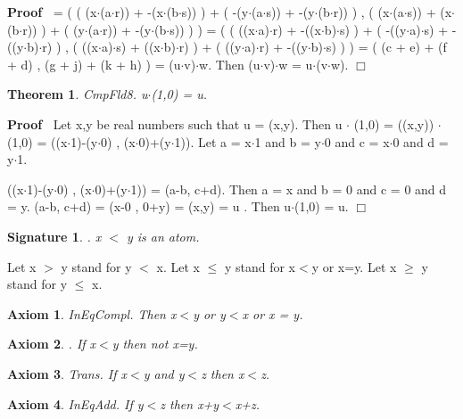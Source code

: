 \documentclass{article}
\newenvironment{forthel}{\begin{leftbar}}{\end{leftbar}}
\newenvironment{proof}{\noindent\textbf{Proof\ }}{\hspace*{\fill}$\Box$\medskip}
\newtheorem{axiom}{Axiom}
\newtheorem{theorem}{Theorem}
\newtheorem{signature}{Signature}
\newcommand{\cmul}{\cdot}
\begin{document}
\begin{forthel}
\begin{proof}
= (  ( (x$\cdot$(a$\cdot$r)) + -(x$\cdot$(b$\cdot$s)) ) + ( -(y$\cdot$(a$\cdot$s)) + -(y$\cdot$(b$\cdot$r)) )  ,  ( (x$\cdot$(a$\cdot$s)) + (x$\cdot$(b$\cdot$r)) ) + ( (y$\cdot$(a$\cdot$r)) + -(y$\cdot$(b$\cdot$s)) ) )
= (  ( ((x$\cdot$a)$\cdot$r) + -((x$\cdot$b)$\cdot$s) ) + ( -((y$\cdot$a)$\cdot$s) + -((y$\cdot$b)$\cdot$r) )  ,  ( ((x$\cdot$a)$\cdot$s) + ((x$\cdot$b)$\cdot$r) ) + ( ((y$\cdot$a)$\cdot$r) + -((y$\cdot$b)$\cdot$s) ) )
= ( (c + e) + (f + d) , (g + j) + (k + h) ) = (u$\cmul$v)$\cmul$w.
Then (u$\cmul$v)$\cmul$w = u$\cmul$(v$\cmul$w). \end{proof}



\begin{theorem}
 CmpFld8. u$\cmul$(1,0) = u.
\end{theorem}\begin{proof}
 Let x,y be real numbers such that u = (x,y). Then u $\cmul$ (1,0) = ((x,y)) $\cmul$ (1,0) = ((x$\cdot$1)-(y$\cdot$0) , (x$\cdot$0)+(y$\cdot$1)). 
Let a = x$\cdot$1 and b = y$\cdot$0 and c = x$\cdot$0 and d = y$\cdot$1.

((x$\cdot$1)-(y$\cdot$0) , (x$\cdot$0)+(y$\cdot$1)) = (a-b, c+d).
Then a = x and b = 0 and c = 0 and d = y.
(a-b, c+d) = (x-0 , 0+y) = (x,y) = u .
Then u$\cmul$(1,0) = u.
\end{proof}







\begin{signature}. x $<$ y is an atom.

\end{signature}
Let x $>$ y stand for y $<$ x.
Let x $\leq$ y stand for x$<$y or x=y.
Let x $\geq$ y stand for y $\leq$ x.

\begin{axiom} InEqCompl. Then x$<$y or y$<$x or x = y.

\end{axiom}
\begin{axiom}. If x$<$y then not x=y.

\end{axiom}

\begin{axiom} Trans. If x$<$y and y$<$z then x$<$z.

\end{axiom}


\begin{axiom} InEqAdd. If y$<$z then x+y$<$x+z.


\end{axiom}
\end{forthel}
\end{document}
